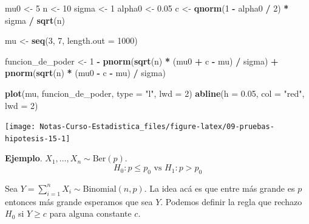 \documentclass[
  12pt,
]{book}
\newenvironment{Shaded}{\begin{snugshade}}{\end{snugshade}}
\newcommand{\DataTypeTok}[1]{\textcolor[rgb]{0.13,0.29,0.53}{#1}}
\newcommand{\DecValTok}[1]{\textcolor[rgb]{0.00,0.00,0.81}{#1}}
\newcommand{\FloatTok}[1]{\textcolor[rgb]{0.00,0.00,0.81}{#1}}
\newcommand{\KeywordTok}[1]{\textcolor[rgb]{0.13,0.29,0.53}{\textbf{#1}}}
\newcommand{\NormalTok}[1]{#1}
\newcommand{\OperatorTok}[1]{\textcolor[rgb]{0.81,0.36,0.00}{\textbf{#1}}}
\newcommand{\StringTok}[1]{\textcolor[rgb]{0.31,0.60,0.02}{#1}}
\begin{document}
\begin{Shaded}
\begin{Highlighting}[]
\NormalTok{mu0 \textless{}{-}}\StringTok{ }\DecValTok{5}
\NormalTok{n \textless{}{-}}\StringTok{ }\DecValTok{10}
\NormalTok{sigma \textless{}{-}}\StringTok{ }\DecValTok{1}
\NormalTok{alpha0 \textless{}{-}}\StringTok{ }\FloatTok{0.05}
\NormalTok{c \textless{}{-}}\StringTok{ }\KeywordTok{qnorm}\NormalTok{(}\DecValTok{1} \OperatorTok{{-}}\StringTok{ }\NormalTok{alpha0 }\OperatorTok{/}\StringTok{ }\DecValTok{2}\NormalTok{) }\OperatorTok{*}\StringTok{ }\NormalTok{sigma }\OperatorTok{/}\StringTok{ }\KeywordTok{sqrt}\NormalTok{(n)}

\NormalTok{mu \textless{}{-}}\StringTok{ }\KeywordTok{seq}\NormalTok{(}\DecValTok{3}\NormalTok{, }\DecValTok{7}\NormalTok{, }\DataTypeTok{length.out =} \DecValTok{1000}\NormalTok{)}

\NormalTok{funcion\_de\_poder \textless{}{-}}\StringTok{ }\DecValTok{1} \OperatorTok{{-}}
\StringTok{  }\KeywordTok{pnorm}\NormalTok{(}\KeywordTok{sqrt}\NormalTok{(n) }\OperatorTok{*}\StringTok{ }\NormalTok{(mu0 }\OperatorTok{+}\StringTok{ }\NormalTok{c }\OperatorTok{{-}}\StringTok{ }\NormalTok{mu) }\OperatorTok{/}\StringTok{ }\NormalTok{sigma) }\OperatorTok{+}
\StringTok{  }\KeywordTok{pnorm}\NormalTok{(}\KeywordTok{sqrt}\NormalTok{(n) }\OperatorTok{*}\StringTok{ }\NormalTok{(mu0 }\OperatorTok{{-}}\StringTok{ }\NormalTok{c }\OperatorTok{{-}}\StringTok{ }\NormalTok{mu) }\OperatorTok{/}\StringTok{ }\NormalTok{sigma)}

\KeywordTok{plot}\NormalTok{(mu, funcion\_de\_poder, }\DataTypeTok{type =} \StringTok{"l"}\NormalTok{, }\DataTypeTok{lwd =} \DecValTok{2}\NormalTok{)}
\KeywordTok{abline}\NormalTok{(}\DataTypeTok{h =} \FloatTok{0.05}\NormalTok{, }\DataTypeTok{col =} \StringTok{"red"}\NormalTok{, }\DataTypeTok{lwd =} \DecValTok{2}\NormalTok{)}
\end{Highlighting}
\end{Shaded}

\begin{center}\texttt{[image: Notas-Curso-Estadistica\_files/figure-latex/09-pruebas-hipotesis-15-1]} \end{center}

\textbf{Ejemplo}. \(X_1,\dots,X_n \sim \text{Ber}(p)\).
\[H_0: p\leq p_{0} \text{ vs } H_1: p>p_0\]

Sea \(Y = \sum_{i=1}^nX_i \sim \text{Binomial}(n,p)\).
La idea acá es que entre más grande es \(p\) entonces más grande esperamos que
sea \(Y\). Podemos definir la regla que rechazo \(H_0\) si \(Y\geq c\) para alguna
constante \(c\).
\end{document}
